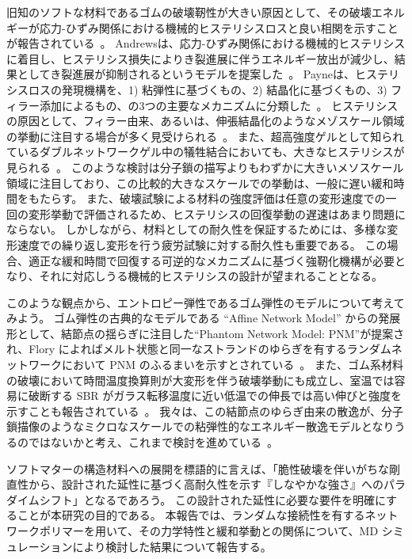 \documentclass[uplatex,dvipdfmx,a4paper,10pt]{jsarticle}
\makeatletter
\def\subsection{\@startsection{subsection}{2}{\z@}{0.2\Cvs \@plus.5\Cdp \@minus.2\Cdp}{0.1\Cvs \@plus.3\Cdp}{\reset@font\normalsize\bfseries}}
\makeatother
\begin{document}
旧知のソフトな材料であるゴムの破壊靭性が大きい原因として、その破壊エネルギーが応力-ひずみ関係における機械的ヒステリシスロスと良い相関を示すことが報告されている~\cite{payne1}。
Andrewsは、応力-ひずみ関係における機械的ヒステリシスに着目し、ヒステリシス損失によりき裂進展に伴うエネルギー放出が減少し、結果としてき裂進展が抑制されるというモデルを提案した~\cite{andrews}。
Payneは、ヒステリシスロスの発現機構を、1) 粘弾性に基づくもの、2) 結晶化に基づくもの、3) フィラー添加によるもの、の3つの主要なメカニズムに分類した~\cite{payne2}。
ヒステリシスの原因として、フィラー由来、あるいは、伸張結晶化のようなメゾスケール領域の挙動に注目する場合が多く見受けられる~\cite{zhang}。
また、超高強度ゲルとして知られているダブルネットワークゲル中の犠牲結合においても、大きなヒステリシスが見られる~\cite{gong}。
このような検討は分子鎖の描写よりもわずかに大きいメソスケール領域に注目しており、この比較的大きなスケールでの挙動は、一般に遅い緩和時間をもたらす。
また、破壊試験による材料の強度評価は任意の変形速度での一回の変形挙動で評価されるため、ヒステリシスの回復挙動の遅速はあまり問題にならない。
しかしながら、材料としての耐久性を保証するためには、多様な変形速度での繰り返し変形を行う疲労試験に対する耐久性も重要である。
この場合、適正な緩和時間で回復する可逆的なメカニズムに基づく強靭化機構が必要となり、それに対応しうる機械的ヒステリシスの設計が望まれることとなる。

このような観点から、エントロピー弾性であるゴム弾性のモデルについて考えてみよう。
ゴム弾性の古典的なモデルである ``Affine Network Model'' からの発展形として、結節点の揺らぎに注目した``Phantom Network Model: PNM''が提案され、Flory によればメルト状態と同一なストランドのゆらぎを有するランダムネットワークにおいて PNM のふるまいを示すとされている~\cite{flory}。
また、ゴム系材料の破壊において時間温度換算則が大変形を伴う破壊挙動にも成立し、室温では容易に破断する SBR がガラス転移温度に近い低温での伸長では高い伸びと強度を示すことも報告されている~\cite{smith}。
我々は、この結節点のゆらぎ由来の散逸が、分子鎖描像のようなミクロなスケールでの粘弾性的なエネルギー散逸モデルとなりうるのではないかと考え、これまで検討を進めている~\cite{sasaki}。








ソフトマターの構造材料への展開を標語的に言えば、「脆性破壊を伴いがちな剛直性から、設計された延性に基づく高耐久性を示す『しなやかな強さ』へのパラダイムシフト」となるであろう。
この設計された延性に必要な要件を明確にすることが本研究の目的である。
本報告では、ランダムな接続性を有するネットワークポリマーを用いて、その力学特性と緩和挙動との関係について、MD シミュレーションにより検討した結果について報告する。
\end{document}
